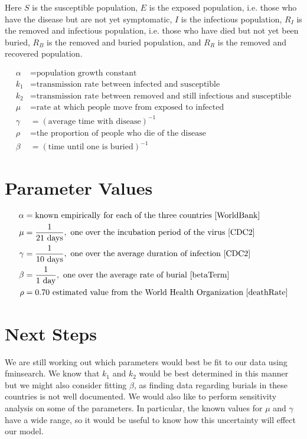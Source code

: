 \documentclass{article}
\begin{document}
   
Here $S$ is the susceptible population, $E$ is the exposed population, i.e. those who have the disease but are not yet symptomatic, $I$ is the infectious population, $R_I$ is the removed and infectious population, i.e. those who have died but not yet been buried, $R_B$ is the removed and buried population, and $R_R$ is the removed and recovered population.

\begin{align*}
\alpha &= \text{population growth constant} \\
k_1    &= \text{transmission rate between infected and susceptible} \\
k_2	   &= \text{transmission rate between removed and still infectious and susceptible} \\
\mu    &= \text{rate at which people move from exposed to infected} \\
\gamma &= (\text{average time with disease} )^{-1}\\
\rho   &= \text{the proportion of people who die of the disease} \\
\beta  &= (\text{time until one is buried})^{-1}
\end{align*}

\section{Parameter Values}
\begin{align*}
\alpha &=  \text{known empirically for each of the three countries \cite{WorldBank}}\\
\mu    &= \frac{1}{21 \text{ days}},\ \text{one over the  incubation period of the virus } \cite{CDC2}  \\
\gamma &= \frac{1}{10 \text{ days}},\ \text{one over the average duration of infection } \cite{CDC2} \\ 
\beta  &= \frac{1}{1 \text{ day}}, \ \text{one over the average rate of burial }  \cite{betaTerm} \\ %
\rho   &= 0.70 \ \text{estimated value from the World Health Organization } \cite{deathRate}
\end{align*}

\section{Next Steps}
We are still working out which parameters would best be fit to our data using fminsearch. We know that $k_1$ and $k_2$ would be best determined in this manner but we might also consider fitting $\beta$, as finding data regarding burials in these countries is not well documented. We would also like to perform sensitivity analysis on some of the parameters. In particular, the known values for $\mu$ and $\gamma$ have a wide range, so it would be useful to know how this uncertainty will effect our model. \\
\end{document}
